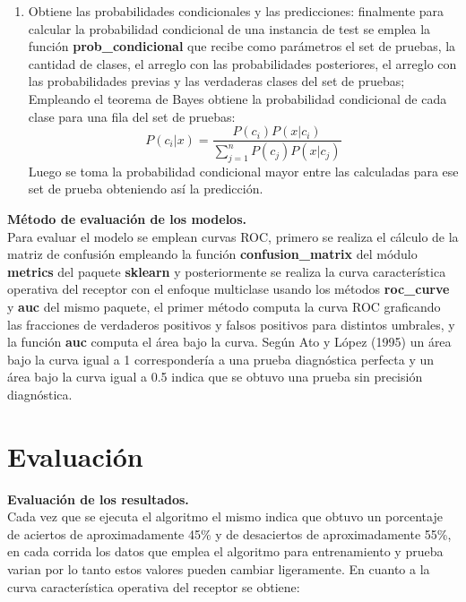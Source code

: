 \begin{enumerate}
	\item Obtiene las probabilidades condicionales y las predicciones:
	finalmente para calcular la probabilidad condicional de una instancia de test se emplea la función
	\textbf{prob\_condicional} que recibe como parámetros el set de pruebas, la cantidad de clases, el
	arreglo con las probabilidades posteriores, el arreglo con las probabilidades previas y las verdaderas
	clases del set de pruebas; Empleando el teorema de Bayes obtiene la probabilidad condicional de cada
	clase para una fila del set de pruebas:
	\[P\left(c_{i}|x\right)=
	\frac{P\left(c_{i}\right)P\left(x|c_{i}\right)}{\sum_{j=1}^{n}P\left(c_{j}\right)P\left(x|c_{j}\right)}
	\]
	Luego se toma la probabilidad condicional mayor entre las calculadas para ese set de prueba
	obteniendo así la predicción.
\end{enumerate}

\noindent
\textbf{Método de evaluación de los modelos.}\\

Para evaluar el modelo se emplean curvas ROC, primero se realiza el cálculo de la matriz de confusión empleando la función
\textbf{confusion\_matrix} del módulo \textbf{metrics} del paquete \textbf{sklearn}
y posteriormente se realiza la curva característica operativa del receptor con el enfoque multiclase usando los métodos
\textbf{roc\_curve} y \textbf{auc} del mismo paquete, el primer método computa la curva ROC graficando las fracciones de
verdaderos positivos y falsos positivos para distintos umbrales, y la función \textbf{auc} computa el área bajo la curva.
Según Ato y López (1995) un área bajo la curva igual a 1 correspondería a una prueba diagnóstica perfecta y un
área bajo la curva igual a 0.5 indica que se obtuvo una prueba sin precisión diagnóstica.

\section{Evaluación}

\noindent
\textbf{Evaluación de los resultados.}\\

Cada vez que se ejecuta el algoritmo el mismo indica que obtuvo un porcentaje de aciertos de aproximadamente
45\% y de desaciertos de aproximadamente 55\%, en cada corrida los datos que emplea el algoritmo para entrenamiento
y prueba varian por lo tanto estos valores pueden cambiar ligeramente. En cuanto a la curva característica
operativa del receptor se obtiene:

